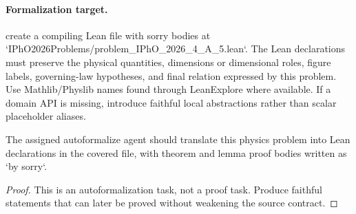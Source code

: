\paragraph{Formalization target.}
create a compiling Lean file with sorry bodies at `IPhO2026Problems/problem\_IPhO\_2026\_4\_A\_5.lean`.
The Lean declarations must preserve the physical quantities, dimensions or dimensional roles, figure labels, governing-law hypotheses, and final relation expressed by this problem.
Use Mathlib/Physlib names found through LeanExplore where available. If a domain API is missing, introduce faithful local abstractions rather than scalar placeholder aliases.

\begin{theorem}
\label{thm:physics:IPhO_2026_4_A_5:target}
The assigned autoformalize agent should translate this physics problem into Lean declarations in the covered file, with theorem and lemma proof bodies written as `by sorry`.
\end{theorem}
\begin{proof}
This is an autoformalization task, not a proof task. Produce faithful statements that can later be proved without weakening the source contract.
\end{proof}


